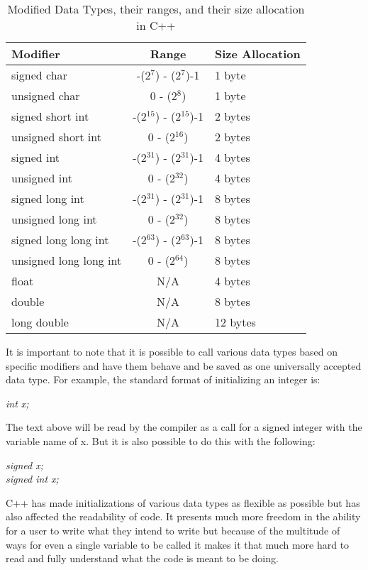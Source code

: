 \documentclass[12pt]{article}
\begin{document}
\begin{table}[h!]
  \begin{center}
    \caption{Modified Data Types, their ranges, and their size allocation in C++}
    \label{table:DT2}
    \begin{tabular}{|l|c|l|}
      \toprule %
      \textbf{Modifier} & \textbf{Range} & \textbf{Size Allocation}\\
      \midrule %
      signed char & -(2$^7$) - (2$^7$)-1 & 1 byte \\ 
      \hline
      unsigned char & 0 - (2$^8$) & 1 byte \\
      \hline
      signed short int & -(2$^15$) - (2$^15$)-1 & 2 bytes \\
      \hline
      unsigned short int & 0 - (2$^16$) & 2 bytes \\
      \hline
      signed int & -(2$^31$) - (2$^31$)-1 & 4 bytes\\
      \hline
      unsigned int & 0 - (2$^32$) & 4 bytes\\
      \hline
      signed long int & -(2$^31$) - (2$^31$)-1 & 8 bytes\\
      \hline
      unsigned long int & 0 - (2$^32$) & 8 bytes\\
      \hline
      signed long long int & -(2$^63$) - (2$^63$)-1 & 8 bytes\\
      \hline
      unsigned long long int & 0 - (2$^64$) & 8 bytes\\
      \hline
      float & N/A & 4 bytes\\
      \hline
      double & N/A & 8 bytes \\
      \hline
      long double & N/A & 12 bytes \\
      \bottomrule
    \end{tabular}
  \end{center}
\end{table}

It is important to note that it is possible to call various data types based on specific modifiers and have them behave and be saved as one universally accepted data type. For example, the standard format of initializing an integer is: \\ 
\begin{center}
  \textit{int x;}
\end{center}
The text above will be read by the compiler as a call for a signed integer with the variable name of x. But it is also possible to do this with the following:\\
\begin{center}
  \textit{signed x;\\signed int x;}
\end{center}
C++ has made initializations of various data types as flexible as possible but has also affected the readability of code. It presents much more freedom in the ability for a user to write what they intend to write but because of the multitude of ways for even a single variable to be called it makes it that much more hard to read and fully understand what the code is meant to be doing.
\end{document}
